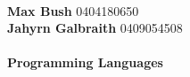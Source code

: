 \documentclass[9pt]{developercv}
\newcommand{\CC}{C\nolinebreak\hspace{-.05em}\raisebox{.4ex}{\tiny\bf +}\nolinebreak\hspace{-.10em}\raisebox{.4ex}{\tiny\bf +}}
\def\CC{{C\nolinebreak[4]\hspace{-.05em}\raisebox{.4ex}{\tiny\bf ++}}}
\begin{document}
\begin{minipage}[t]{0.1\textwidth}
\hphantom{0.1}
\end{minipage}
	\begin{minipage}[t]{0.3\textwidth}
		\\
		\textbf{Max Bush} 0404180650\\
		\textbf{Jahyrn Galbraith} 0409054508\\

			\\\textbf{Programming Languages}\\
			\begin{barchart}{3.0}
				\baritem{\CC}{100}
			\end{barchart}
	\end{minipage}
\end{document}
